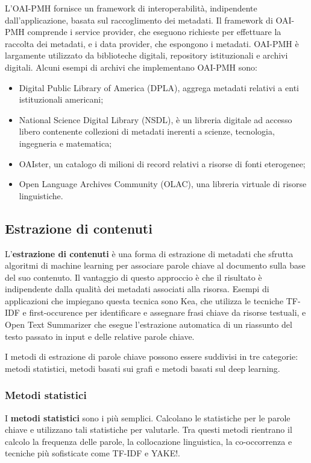 L'OAI-PMH fornisce un framework di interoperabilità, indipendente dall'applicazione, basata sul raccoglimento dei metadati. Il framework di OAI-PMH comprende i service provider, che eseguono richieste per effettuare la raccolta dei metadati, e i data provider, che espongono i metadati. OAI-PMH è largamente utilizzato da biblioteche digitali, repository istituzionali e archivi digitali\cite{harvesting}. Alcuni esempi di archivi che implementano OAI-PMH sono:

\begin{itemize}
\item Digital Public Library of America (DPLA), aggrega metadati relativi a enti istituzionali americani;
\item National Science Digital Library (NSDL), è un libreria digitale ad accesso libero contenente collezioni di metadati inerenti a scienze, tecnologia, ingegneria e matematica;
\item OAIster, un catalogo di milioni di record relativi a risorse di fonti eterogenee;
\item Open Language Archives Community (OLAC), una libreria virtuale di risorse linguistiche.
\end{itemize}

\subsection{Estrazione di contenuti}
L'\textbf{estrazione di contenuti} è una forma di estrazione di metadati che sfrutta algoritmi di machine learning per associare parole chiave al documento sulla base del suo contenuto. Il vantaggio di questo approccio è che il risultato è indipendente dalla qualità dei metadati associati alla risorsa. Esempi di applicazioni che impiegano questa tecnica sono Kea, che utilizza le tecniche TF-IDF e first-occurence per identificare e assegnare frasi chiave da risorse testuali, e Open Text Summarizer che esegue l'estrazione automatica di un riassunto del testo passato in input e delle relative parole chiave. 

I metodi di estrazione di parole chiave possono essere suddivisi in tre categorie: metodi statistici, metodi basati sui grafi e metodi basati sul deep learning\cite{extraction}.

\subsubsection{Metodi statistici}
I \textbf{metodi statistici} sono i più semplici. Calcolano le statistiche per le parole chiave e utilizzano tali statistiche per valutarle. Tra questi metodi rientrano il calcolo la frequenza delle parole, la collocazione linguistica, la co-occorrenza e tecniche più sofisticate come TF-IDF e YAKE!.

